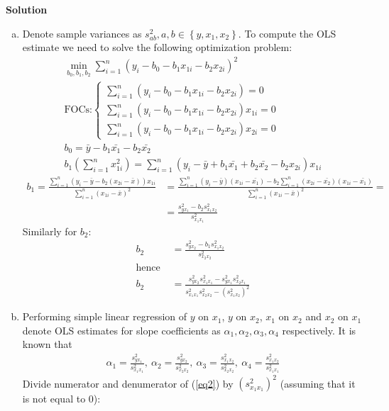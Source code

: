 \documentclass[a4paper]{article}
\newcommand{\summa}{\sum_{i=1}^n}
\begin{document}
\textbf{Solution}


\begin{enumerate}[(a)]
	\item Denote sample variances as $s^2_{ab}, a, b \in \left\{y, x_1, x_2\right\}$. To compute the OLS estimate we need to solve the following optimization problem:
	\begin{align*}
	\underset{b_0, b_1, b_2}{\min} \summa (y_i - b_0 - b_1x_{1i} - b_2x_{2i})^2\\
	\text{FOCs:} \begin{cases}
	\summa (y_i - b_0 - b_1x_{1i} - b_2x_{2i}) = 0\\
	\summa (y_i - b_0 - b_1x_{1i} - b_2x_{2i})x_{1i} = 0\\
	\summa (y_i - b_0 - b_1x_{1i} - b_2x_{2i})x_{2i} = 0
	\end{cases}\\
	b_0 = \bar{y} - b_1\bar{x_1} - b_2 \bar{x_2}\\
	b_1\left(\summa x_{1i}^2\right) = \summa (y_i - \bar{y} + b_1\bar{x_1} + b_2\bar{x_2} - b_2x_{2i})x_{1i}
	\end{align*}
	\begin{align*}
	b_1 = \frac{\summa (y_i - \bar{y} - b_2(x_{2i} - \bar{x}))x_{1i}}{\summa (x_{1i} - \bar{x})^2}&=\frac{\summa (y_i - \bar{y})(x_{1i} - \bar{x_1}) - b_2\summa(x_{2i} - \bar{x_2})(x_{1i} - \bar{x_1})}{\summa (x_{1i} - \bar{x})^2} =\\
	&=\frac{s^2_{yx_1} - b_2s^2_{x_1x_2}}{s^2_{x_1x_1}}
	\end{align*}
	Similarly for $b_2$:
	\begin{align}\label{eq2}
	b_2 &= \frac{s^2_{yx_2} - b_1s^2_{x_1x_2}}{s^2_{x_2x_2}}\nonumber\\
	\text{hence }\nonumber\\
	b_2 &= \frac{s^2_{yx_2}s^2_{x_1x_1} - s^2_{yx_1}s^2_{x_2x_1}}{s^2_{x_1x_1}s^2_{x_2x_2} - (s^2_{x_1x_2})^2}
	\end{align}
	\item Performing simple linear regression of $y$ on $x_1$, $y$ on $x_2$, $x_1$ on $x_2$ and $x_2$ on $x_1$ denote OLS estimates for slope coefficients as $\alpha_1, \alpha_2, \alpha_3, \alpha_4$ respectively. It is known that
	\begin{align*}
	\alpha_1 = \frac{s^2_{yx_1}}{s^2_{x_1x_1}},\ \alpha_2 = \frac{s^2_{yx_2}}{s^2_{x_2x_2}},\ \alpha_3 = \frac{s^2_{x_1x_2}}{s^2_{x_2x_2}},\ \alpha_4 = \frac{s^2_{x_1x_2}}{s^2_{x_1x_1}}
	\end{align*}
	Divide numerator and denumerator of (\ref{eq2}) by $(s^2_{x_1x_1})^2$ (assuming that it is not equal to 0):

\end{enumerate}
\end{document}
